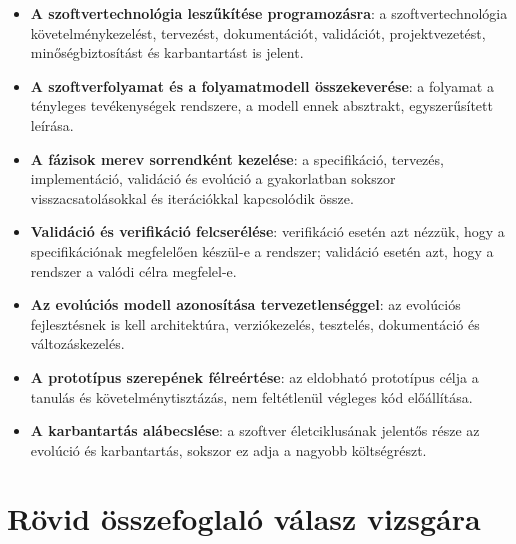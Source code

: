 \begin{warningbox}
\begin{itemize}
  \item \textbf{A szoftvertechnológia leszűkítése programozásra}: a szoftvertechnológia követelménykezelést, tervezést, dokumentációt, validációt, projektvezetést, minőségbiztosítást és karbantartást is jelent.
  \item \textbf{A szoftverfolyamat és a folyamatmodell összekeverése}: a folyamat a tényleges tevékenységek rendszere, a modell ennek absztrakt, egyszerűsített leírása.
  \item \textbf{A fázisok merev sorrendként kezelése}: a specifikáció, tervezés, implementáció, validáció és evolúció a gyakorlatban sokszor visszacsatolásokkal és iterációkkal kapcsolódik össze.
  \item \textbf{Validáció és verifikáció felcserélése}: verifikáció esetén azt nézzük, hogy a specifikációnak megfelelően készül-e a rendszer; validáció esetén azt, hogy a rendszer a valódi célra megfelel-e.
  \item \textbf{Az evolúciós modell azonosítása tervezetlenséggel}: az evolúciós fejlesztésnek is kell architektúra, verziókezelés, tesztelés, dokumentáció és változáskezelés.
  \item \textbf{A prototípus szerepének félreértése}: az eldobható prototípus célja a tanulás és követelménytisztázás, nem feltétlenül végleges kód előállítása.
  \item \textbf{A karbantartás alábecslése}: a szoftver életciklusának jelentős része az evolúció és karbantartás, sokszor ez adja a nagyobb költségrészt.
\end{itemize}
\end{warningbox}

\section{Rövid összefoglaló válasz vizsgára}

